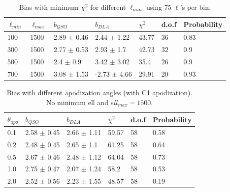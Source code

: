 \documentclass{amsart}
\begin{document}
\begin{center}
\begin{table}[htbp]
\caption{Bias with minimum $\chi^2$  for different $\ell_{min}$ using 75 $\ell$'s per bin.}
\begin{tabular}{p{}p{}p{}p{}p{}p{}p{}} \\ \toprule
$\ell_{min}$ & $\ell_{max}$ & \multicolumn{1}{p{0cm}}{$b_{QSO}$} & $b_{DLA}$ & \multicolumn{1}{p{2cm}}{$\chi^2$} & d.o.f  & Probability\\ \midrule
100  &  1500  &  2.89  $\pm$  0.46  &  2.44  $\pm$  1.22  &  43.77  &  36  &  0.83 \\
300  &  1500  &  2.77  $\pm$  0.53  &  2.93  $\pm$  1.7  &  42.73  &  32  &  0.9 \\
500  &  1500  &  2.4  $\pm$  0.9  &  3.42  $\pm$  3.02  &  35.4  &  26  &  0.9 \\
700  &  1500  &  3.08  $\pm$  1.53  &  -2.73  $\pm$  4.66  &  29.91  &  20  &  0.93 \\
 \bottomrule
\end{tabular}

\end{table}
\end{center}

\begin{table}
\vspace{5cm}
\caption{Bias with different apodization angles (with C1 apodization). No minimum ell and $ell_{max}=1500$.}
\begin{tabular}{p{}p{}p{}p{}p{}p{}} \\ \toprule
 $\theta_{apo}$ & \multicolumn{1}{p{0cm}}{$b_{QSO}$} & $b_{DLA}$ & \multicolumn{1}{p{2cm}}{$\chi^2$} & d.o.f  & Probability\\ \midrule
0.1  &  2.58  $\pm$  0.45  &  2.66  $\pm$  1.11  &  59.57  &  58  &  0.58 \\
0.2  &  2.48  $\pm$  0.45  &  2.65  $\pm$  1.1  &  61.25  &  58  &  0.64 \\
0.5  &  2.67  $\pm$  0.46  &  2.48  $\pm$  1.12  &  64.04  &  58  &  0.73 \\
1.0  &  2.75  $\pm$  0.47  &  2.07  $\pm$  1.24  &  58.2  &  58  &  0.53 \\
2.0  &  2.52  $\pm$  0.56  &  2.23  $\pm$  1.55  &  48.57  &  58  &  0.19 \\
 \bottomrule
\end{tabular}
\end{table}
\end{document}
